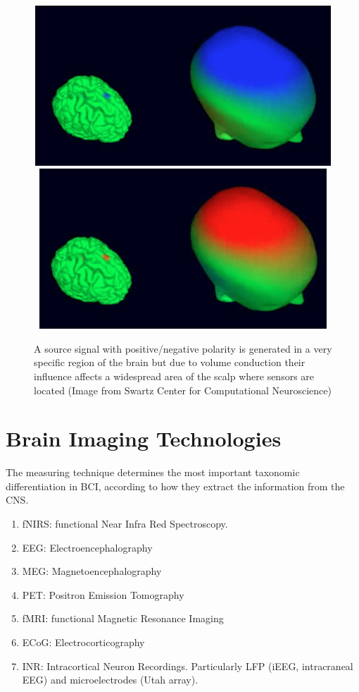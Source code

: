\begin{figure}[]
\centering
\includegraphics[height=6cm,width=14cm]{images/volconduction1.png}
\includegraphics[height=6cm,width=14cm]{images/volconduction2.png}
\caption[EEG Volume Conduction]{A source signal with positive/negative polarity is generated in a very specific region of the brain but due to volume conduction their influence affects a widespread area of the scalp where sensors are located (Image from Swartz Center for Computational Neuroscience) }
\label{fig:volconduction}
\end{figure}

\section{Brain Imaging Technologies}

The measuring technique determines the most important taxonomic differentiation in BCI, according to how they extract the information from the CNS.

\begin{enumerate}
\item fNIRS: functional Near Infra Red Spectroscopy.
\item EEG: Electroencephalography
\item MEG: Magnetoencephalography
\item PET: Positron Emission Tomography
\item fMRI: functional Magnetic Resonance Imaging
\item ECoG: Electrocorticography 
\item INR: Intracortical Neuron Recordings.  Particularly LFP (iEEG, intracraneal EEG\cite{Buzsaki2012}) and microelectrodes (Utah array).
\end{enumerate}

